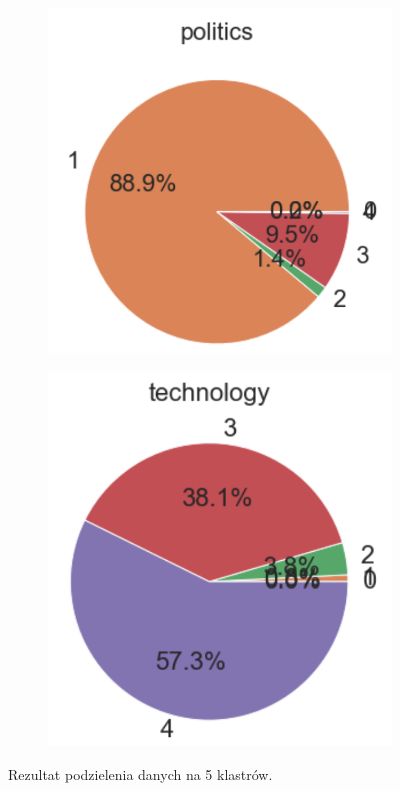 \begin{figure}[H]
\begin{subfigure}[b]{0.38\textwidth}
     \end{subfigure}
     \hfill
     \begin{subfigure}[b]{0.38\textwidth}
         \centering
         \includegraphics[width=\textwidth]{images/analiza/c_p.png}
     \end{subfigure}
     \hfill
     \begin{subfigure}[b]{0.38\textwidth}
         \centering
         \includegraphics[width=\textwidth]{images/analiza/c_t.png}
     \end{subfigure}
        \caption{Rezultat podzielenia danych na 5 klastrów.}
        \label{fig:classifiers_test}
\end{figure}

